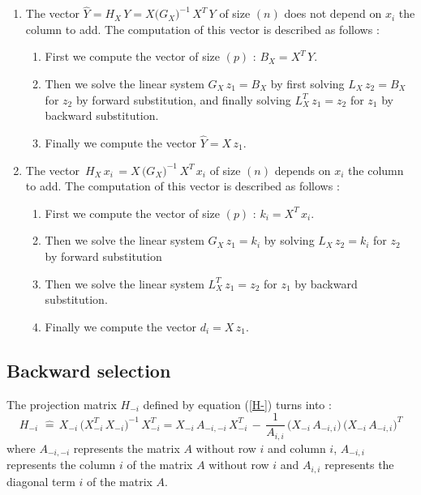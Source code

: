 \begin{enumerate}
\item The vector $\hat{Y}=H_X\,Y=X\big(G_X\big)^{-1}\,X^T\,Y $ of size $(n)$ does not depend on $x_i$ the column to add.
The computation of this vector is described as follows :
\begin{enumerate}
\item First we compute the vector of size $(p)$ : $B_X=X^T\,Y$.
\item Then we solve the linear system $G_X \,z_1= B_X$ by first solving $L_X\,z_2= B_X$ for $z_2$ by forward substitution, and finally
 solving $L_X^T\,z_1=z_2$ for $z_1$ by backward substitution.
\item Finally we compute the vector $\hat{Y}=X\,z_1$.
\end{enumerate}
\item The vector $\,H_X\,x_i\,=X\,\big(G_X\big)^{-1}\,X^T\,x_i$ of size $(n)$ depends on $x_i$ the column to add.
The computation of this vector is described as follows :
\begin{enumerate}
\item First we compute the vector of size $(p)$ : $ k_i=X^T\,x_i$.
\item Then we solve the linear system $G_X \,z_1= k_i$ by solving $L_X\,z_2= k_i$ for $z_2$ by forward substitution
\item Then we solve the linear system $L_X^T\,z_1=z_2$ for $z_1$ by backward substitution.
\item Finally we compute the vector $d_i = X\,z_1$.
\end{enumerate}
\end{enumerate}



\newpage
\subsection{Backward selection}
The projection matrix $H_{-i}$ defined by equation (\ref{H-}) turns into :
 \begin{equation}
\label{H2-}
H_{-i}\, \,\hat{=}\, X_{-i}\,\big(X^T_{-i} \,X_{-i}\big)^{-1} \,X^T_{-i}
= X_{-i}\,A_{-i,-i} \, X^T_{-i} \,-\,\frac {1}{A_{i,i}}\,\big(X_{-i}\, A_{-i,i}\big)\, \big(X_{-i}\, A_{-i,i}\big)^T
 \end{equation}
where $A_{-i,-i}$ represents the matrix $A$ without row $i$ and column $i$,
$A_{-i,i}$ represents the column $i$ of the matrix $A$ without row $i$ and $A_{i,i}$ represents the diagonal term $i$ of the matrix $A$.\\

